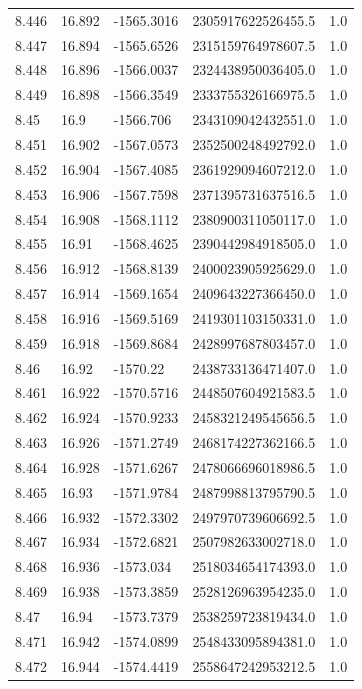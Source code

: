 \begin{tabular}{lllll}
8.446 & 16.892 & -1565.3016 & 2305917622526455.5 & 1.0 \\
8.447 & 16.894 & -1565.6526 & 2315159764978607.5 & 1.0 \\
8.448 & 16.896 & -1566.0037 & 2324438950036405.0 & 1.0 \\
8.449 & 16.898 & -1566.3549 & 2333755326166975.5 & 1.0 \\
8.45 & 16.9 & -1566.706 & 2343109042432551.0 & 1.0 \\
8.451 & 16.902 & -1567.0573 & 2352500248492792.0 & 1.0 \\
8.452 & 16.904 & -1567.4085 & 2361929094607212.0 & 1.0 \\
8.453 & 16.906 & -1567.7598 & 2371395731637516.5 & 1.0 \\
8.454 & 16.908 & -1568.1112 & 2380900311050117.0 & 1.0 \\
8.455 & 16.91 & -1568.4625 & 2390442984918505.0 & 1.0 \\
8.456 & 16.912 & -1568.8139 & 2400023905925629.0 & 1.0 \\
8.457 & 16.914 & -1569.1654 & 2409643227366450.0 & 1.0 \\
8.458 & 16.916 & -1569.5169 & 2419301103150331.0 & 1.0 \\
8.459 & 16.918 & -1569.8684 & 2428997687803457.0 & 1.0 \\
8.46 & 16.92 & -1570.22 & 2438733136471407.0 & 1.0 \\
8.461 & 16.922 & -1570.5716 & 2448507604921583.5 & 1.0 \\
8.462 & 16.924 & -1570.9233 & 2458321249545656.5 & 1.0 \\
8.463 & 16.926 & -1571.2749 & 2468174227362166.5 & 1.0 \\
8.464 & 16.928 & -1571.6267 & 2478066696018986.5 & 1.0 \\
8.465 & 16.93 & -1571.9784 & 2487998813795790.5 & 1.0 \\
8.466 & 16.932 & -1572.3302 & 2497970739606692.5 & 1.0 \\
8.467 & 16.934 & -1572.6821 & 2507982633002718.0 & 1.0 \\
8.468 & 16.936 & -1573.034 & 2518034654174393.0 & 1.0 \\
8.469 & 16.938 & -1573.3859 & 2528126963954235.0 & 1.0 \\
8.47 & 16.94 & -1573.7379 & 2538259723819434.0 & 1.0 \\
8.471 & 16.942 & -1574.0899 & 2548433095894381.0 & 1.0 \\
8.472 & 16.944 & -1574.4419 & 2558647242953212.5 & 1.0 \\

\end{tabular}
